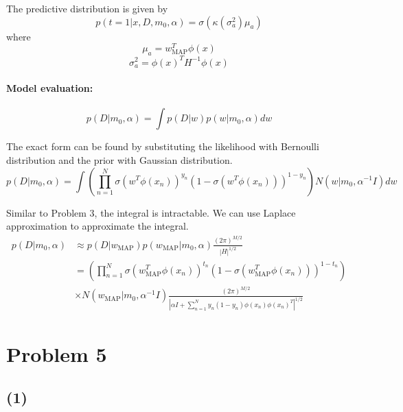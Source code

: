 \documentclass[a4paper,12pt]{article}
\begin{document}
The predictive distribution is given by
\begin{equation*}
	p(t = 1|x, D, m_0, \alpha) = \sigma(\kappa(\sigma_a^2) \mu_a)
\end{equation*}
where
\begin{equation*}
	\mu_a = w_\text{MAP}^T \phi(x)
\end{equation*}
\begin{equation*}
	\sigma_a^2 = \phi(x)^T H^{-1} \phi(x)
\end{equation*}

\paragraph{Model evaluation:}
\begin{equation*}
	p(D|m_0, \alpha) = \int p(D|w) p(w|m_0, \alpha) dw
\end{equation*}

The exact form can be found by substituting the likelihood with Bernoulli distribution and the prior with Gaussian distribution.
\begin{equation*}
	p(D|m_0, \alpha) = \int \left( \prod_{n=1}^{N} \sigma(w^T \phi(x_n))^{y_n} (1 - \sigma(w^T \phi(x_n)))^{1 - y_n} \right) N(w|m_0, \alpha^{-1} I) dw
\end{equation*}

Similar to Problem 3, the integral is intractable. We can use Laplace approximation to approximate the integral.
\begin{align*}
	p(D|m_0, \alpha) &\approx p(D|w_\text{MAP}) p(w_\text{MAP}|m_0, \alpha) \frac{(2\pi)^{M/2}}{|H|^{1/2}} \\
	&= \left( \prod_{n=1}^{N} \sigma(w_\text{MAP}^T \phi(x_n))^{t_n} (1 - \sigma(w_\text{MAP}^T \phi(x_n)))^{1 - t_n} \right) \\
	&\times N(w_\text{MAP}|m_0, \alpha^{-1} I) \frac{(2\pi)^{M/2}}{|\alpha I + \sum_{n=1}^{N} y_n (1 - y_n) \phi(x_n) \phi(x_n)^T|^{1/2}}
\end{align*}

\section*{Problem 5}

\subsection*{(1)}
\end{document}
